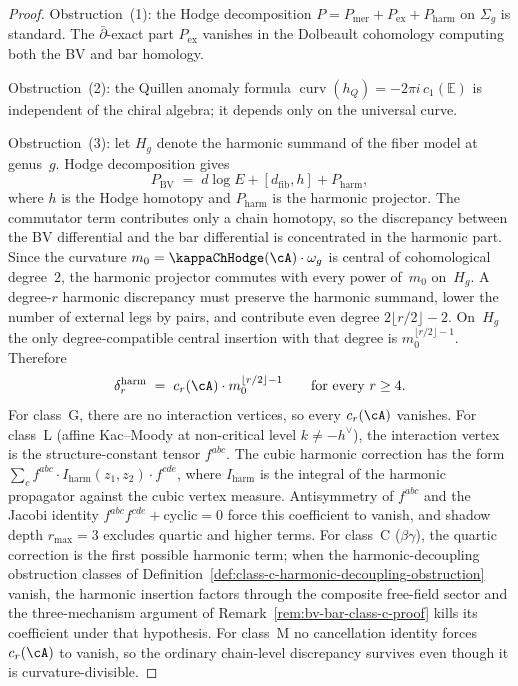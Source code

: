 \begin{proof}
Obstruction~(1): the Hodge decomposition
$P = P_{\mathrm{mer}} + P_{\mathrm{ex}} + P_{\mathrm{harm}}$
on $\Sigma_g$ is standard. The $\bar\partial$-exact part
$P_{\mathrm{ex}}$ vanishes in the Dolbeault cohomology
computing both the BV and bar homology.

Obstruction~(2): the Quillen anomaly formula
$\operatorname{curv}(h_Q) = -2\pi i\,c_1(\mathbb{E})$
\cite{Quillen85} is independent of the chiral algebra;
it depends only on the universal curve.

Obstruction~(3): let $H_g$ denote the harmonic summand of the
fiber model at genus~$g$. Hodge decomposition gives
\[
P_{\mathrm{BV}}
\;=\;
d\log E + [d_{\mathrm{fib}}, h] + P_{\mathrm{harm}},
\]
where $h$ is the Hodge homotopy and $P_{\mathrm{harm}}$ is the
harmonic projector. The commutator term contributes only a chain
homotopy, so the discrepancy between the BV differential and the
bar differential is concentrated in the harmonic part. Since the
curvature $m_0 = \kappaChHodge(\cA)\cdot\omega_g$ is central of
cohomological degree~$2$, the harmonic projector commutes with
every power of~$m_0$ on~$H_g$. A degree-$r$ harmonic discrepancy
must preserve the harmonic summand, lower the number of external
legs by pairs, and contribute even degree
$2\lfloor r/2 \rfloor - 2$. On~$H_g$ the only degree-compatible
central insertion with that degree is
$m_0^{\lfloor r/2 \rfloor - 1}$. Therefore
\[
\delta_r^{\mathrm{harm}}
\;=\;
c_r(\cA)\cdot m_0^{\lfloor r/2 \rfloor - 1}
\qquad\text{for every } r \geq 4.
\]
For class~G, there are no interaction vertices, so every
$c_r(\cA)$ vanishes. For class~L
\textup{(}affine Kac--Moody at non-critical level
$k \neq -h^\vee$\textup{)}, the interaction vertex is the
structure-constant tensor $f^{abc}$. The cubic harmonic
correction has the form
$\sum_c f^{abc}\cdot I_{\mathrm{harm}}(z_1,z_2)\cdot f^{cde}$,
where $I_{\mathrm{harm}}$ is the integral of the harmonic
propagator against the cubic vertex measure. Antisymmetry of
$f^{abc}$ and the Jacobi identity
$f^{abc}f^{cde} + \text{cyclic} = 0$ force this coefficient to
vanish, and shadow depth $r_{\max} = 3$ excludes quartic and
higher terms. For class~C
\textup{(}$\beta\gamma$\textup{)}, the quartic correction is the
first possible harmonic term; when the harmonic-decoupling obstruction
classes of Definition~\ref{def:class-c-harmonic-decoupling-obstruction}
vanish, the harmonic insertion factors through the composite
free-field sector and the three-mechanism argument of
Remark~\ref{rem:bv-bar-class-c-proof} kills its coefficient under
that hypothesis. For
class~M no cancellation identity forces
$c_r(\cA)$ to vanish, so the ordinary chain-level discrepancy
survives even though it is curvature-divisible.
\end{proof}

